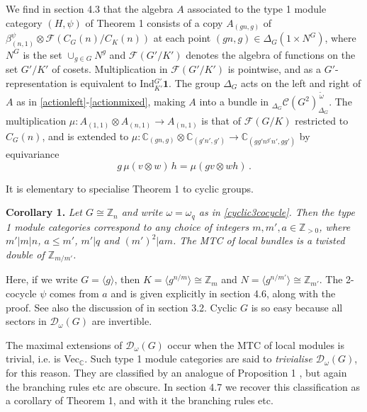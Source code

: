 \documentclass[12pt]{article}
\numberwithin{equation}{section}
\def\cC            {{\mathcal{C}}}
\def\cD            {{\mathcal{D}}}
\def\cF            {{\mathcal{F}}}
\def\bbC           {\mathbb{C}}
\def\bbZ           {\mathbb{Z}}
\begin{document}
We find in section 4.3 that the algebra $A$ associated to the type 1 module category
$(H,\psi)$ of Theorem 1 consists of a copy $A_{(gn,g)}$ of $\beta^\psi_{(n,1)}\otimes \cF(C_G(n)/C_K(n))$ at each point $(gn,g)\in \Delta_G(1\times N^G)$,  
where $N^G$ is the set $\cup_{g\in G}N^g$ and $\cF(G'/K')$ denotes the algebra of functions on the set $G'/K'$ of cosets. Multiplication in $\cF(G'/K')$ is
pointwise, and as a $G'$-representation is equivalent to
Ind$_{K'}^{G'}\mathbf{1}$. The group $\Delta_G$ acts on the left and right of $A$ as in \eqref{actionleft}-\eqref{actionmixed}, making $A$ into a bundle in ${}_{\Delta_G}\cC(G^2)^{\,\tilde{\omega}}_{\Delta_G}$. The multiplication $\mu:A_{(1,1)}\otimes A_{(n,1)}\rightarrow A_{(n,1)}$ is
that of $\cF(G/K)$ restricted to $C_G(n)$, and is extended to $\mu:\bbC_{(gn,g)}\otimes\bbC_{(g'n',g')}\rightarrow\bbC_{(gg'n^{g'}n',gg')}$ by equivariance 
\begin{equation}\label{multequiv}g\,\mu(v\otimes w)\,h=\mu(gv\otimes wh)\,.\end{equation}


It is elementary to specialise Theorem 1 to  cyclic groups.

\medskip\noindent\textbf{Corollary 1.} \textit{Let $G\cong \bbZ_n$ and write $\omega=\omega_q$ as in \eqref{cyclic3cocycle}. 
Then the  type 1 module categories correspond to any choice of integers $m,m',a\in\bbZ_{>0}$, where $m'|m|n$, $a\le m'$,
$m'|q$ and $(m')^2|am$. The MTC of local bundles is a twisted double of $\bbZ_{m/m'}$.} \medskip

Here, if we write $G=\langle g\rangle$, then $K=\langle g^{n/m}\rangle\cong \bbZ_{m}$ and $N=\langle
g^{n/m'}\rangle\cong \bbZ_{m'}$. The 2-cocycle $\psi$ comes from $a$ and is given explicitly in
section 4.6, along with the proof. See also the discussion of \cite{EMS} in section 3.2. Cyclic $G$ is
so easy because all sectors in $\cD_\omega(G)$ are invertible.

The maximal extensions of $\cD_\omega(G)$ occur when the MTC of local modules is trivial, i.e. is Vec$_\bbC$. Such type 1 module categories are said to \textit{trivialise} $\cD_\omega(G)$, for this reason. They are classified by an analogue of Proposition 1 \cite{Ost}, but again the branching rules etc  are obscure. In section 4.7 we recover this classification as a corollary of Theorem 1, and with it the branching rules etc.  
\end{document}
